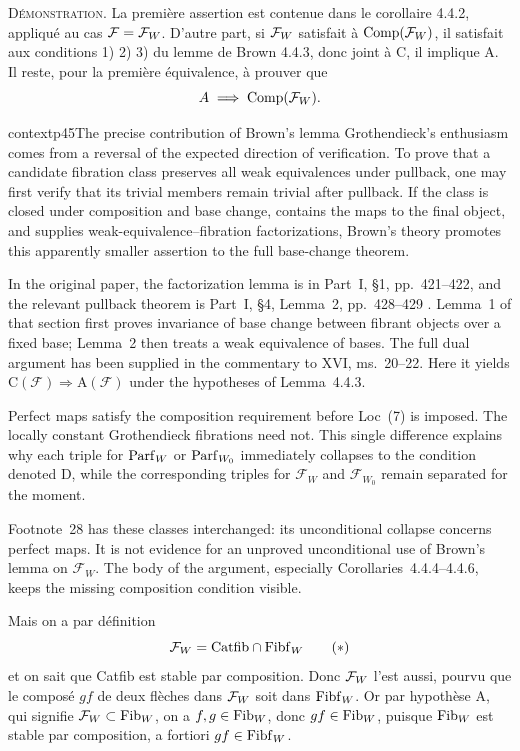 
\textsc{Démonstration}. La première assertion est contenue dans le corollaire 4.4.2, appliqué au cas $\mathcal{F} = \mathcal{F}_W$. D'autre part, si $\mathcal{F}_W$ satisfait à $\mathrm{Comp}(\mathcal{F}_W)$, il satisfait aux conditions 1) 2) 3) du lemme de Brown 4.4.3, donc joint à C, il implique A. Il reste, pour la première équivalence, à prouver que
\[
A \;\Longrightarrow\; \mathrm{Comp}(\mathcal{F}_W).
\]


\begin{dcomment}{context}{p45}{The precise contribution of Brown's lemma}
Grothendieck's enthusiasm comes from a reversal of the expected direction of verification. To prove that a candidate fibration class preserves all weak equivalences under pullback, one may first verify that its trivial members remain trivial after pullback. If the class is closed under composition and base change, contains the maps to the final object, and supplies weak-equivalence--fibration factorizations, Brown's theory promotes this apparently smaller assertion to the full base-change theorem.

In the original paper, the factorization lemma is in Part~I, \S1, pp.~421--422, and the relevant pullback theorem is Part~I, \S4, Lemma~2, pp.~428--429 \citep{Brown1973}. Lemma~1 of that section first proves invariance of base change between fibrant objects over a fixed base; Lemma~2 then treats a weak equivalence of bases. The full dual argument has been supplied in the commentary to XVI, ms.~20--22. Here it yields $\mathrm C(\mathcal F)\Rightarrow\mathrm A(\mathcal F)$ under the hypotheses of Lemma~4.4.3.

Perfect maps satisfy the composition requirement before Loc~(7) is imposed. The locally constant Grothendieck fibrations need not. This single difference explains why each triple for $\mathrm{Parf}_W$ or $\mathrm{Parf}_{W_0}$ immediately collapses to the condition denoted D, while the corresponding triples for $\mathcal F_W$ and $\mathcal F_{W_0}$ remain separated for the moment.

Footnote~28 has these classes interchanged: its unconditional collapse concerns perfect maps. It is not evidence for an unproved unconditional use of Brown's lemma on $\mathcal F_W$. The body of the argument, especially Corollaries~4.4.4--4.4.6, keeps the missing composition condition visible.
\end{dcomment}


Mais on a par définition
\[
\mathcal{F}_W = \mathrm{Catfib} \cap \mathrm{Fibf}_W
\tag*{$(*)$}
\]
et on sait que Catfib est stable par composition. Donc $\mathcal{F}_W$ l'est aussi, pourvu que le composé $gf$ de deux flèches dans $\mathcal{F}_W$ soit dans $\mathrm{Fibf}_W$. Or par hypothèse A, qui signifie $\mathcal{F}_W \subset \mathrm{Fib}_W$, on a $f, g \in \mathrm{Fib}_W$, donc $gf \in \mathrm{Fib}_W$, puisque $\mathrm{Fib}_W$ est stable par composition, a fortiori $gf \in \mathrm{Fibf}_W$.

